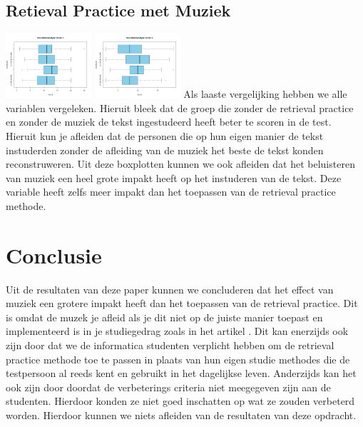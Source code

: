 \documentclass{hogent-article}
\begin{document}
	\subsection{Retieval Practice met Muziek}
	\includegraphics[width=120px]{Rplot_RetrievalPracticeMuziek_Score1}	
	\includegraphics[width=120px]{Rplot_RetrievalPracticeMuziek_Score2}
	Als laaste vergelijking hebben we alle variablen vergeleken. Hieruit bleek dat de groep die zonder de retrieval practice en zonder de muziek de tekst ingestudeerd heeft beter te scoren in de test. Hieruit kun je afleiden dat de personen die op hun eigen manier de tekst instuderden zonder de afleiding van de muziek het beste de tekst konden reconstruweren.
	Uit deze boxplotten kunnen we ook afleiden dat het beluisteren van muziek een heel grote impakt heeft op het instuderen van de tekst. Deze variable heeft zelfs meer impakt dan het toepassen van de retrieval practice methode.  
	
	\section{Conclusie}
	Uit de resultaten van deze paper kunnen we concluderen dat het effect van muziek een grotere impakt heeft dan het toepassen van de retrieval practice. Dit is omdat de muzek je afleid als je dit niet op de juiste manier toepast en implementeerd is in je studiegedrag zoals in het artikel \autocite{ChanEtAl1998}. Dit kan enerzijds ook zijn door dat we de informatica studenten verplicht hebben om de retrieval practice methode toe te passen in plaats van hun eigen studie methodes die de testpersoon al reeds kent en gebruikt in het dagelijkse leven. Anderzijds kan het ook zijn door doordat de verbeterings criteria niet meegegeven zijn aan de studenten. Hierdoor konden ze niet goed inschatten op wat ze zouden verbeterd worden. Hierdoor kunnen we niets afleiden van de resultaten van deze opdracht.
	
	
	\printbibliography[heading=bibintoc]
	
\end{document}
